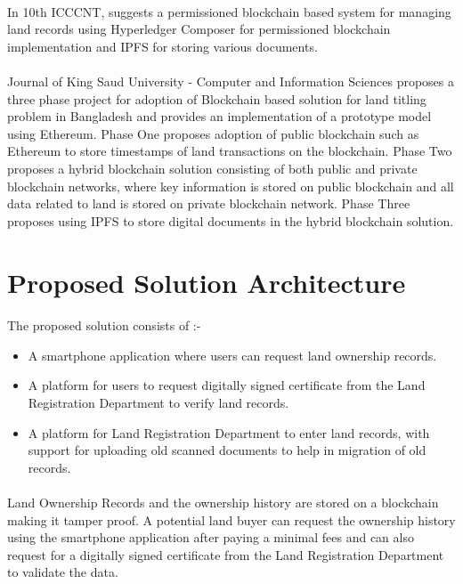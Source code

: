 \documentclass{article}
\begin{document}
        \paragraph{}
        In 10th ICCCNT, \cite{8944471} suggests a permissioned blockchain based system for managing land records using Hyperledger Composer for permissioned blockchain implementation and IPFS for storing various documents.

        \paragraph{}
        Journal of King Saud University - Computer and Information Sciences \cite{ALAM2020} proposes a three phase project for adoption of Blockchain based solution for land titling problem in Bangladesh and provides an implementation of a prototype model using Ethereum. Phase One proposes adoption of public blockchain such as Ethereum to store timestamps of land transactions on the blockchain. Phase Two proposes a hybrid blockchain solution consisting of both public and private blockchain networks, where key information is stored on public blockchain and all data related to land is stored on private blockchain network. Phase Three proposes using IPFS to store digital documents in the hybrid blockchain solution.



\section{Proposed Solution Architecture}
    \paragraph{}
    The proposed solution consists of :-

    \begin{itemize}
        \item A smartphone application where users can request land ownership records.
        \item A platform for users to request digitally signed certificate from the Land Registration Department to verify land records.
        \item A platform for Land Registration Department to enter land records, with support for uploading old scanned documents to help in migration of old records.
    \end{itemize}

    \paragraph{}
    Land Ownership Records and the ownership history are stored on a blockchain making it tamper proof. A potential land buyer can request the ownership history using the smartphone application after paying a minimal fees and can also request for a digitally signed certificate from the Land Registration Department to validate the data.
\end{document}
